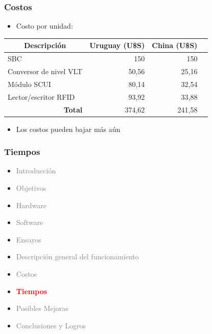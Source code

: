 \documentclass{beamer}
\begin{document}
\begin{frame}
	\frametitle{Costos}
	\begin{itemize}
		\item[] Costo por unidad:
	\end{itemize}
	
	\begin{table}[htbp]
	\begin{tabular}{|l|r|r|r|}
		\hline
		\multicolumn{1}{|c|}{\textbf{Descripción }} & \multicolumn{1}{c|}{\textbf{Uruguay (U\$S)}} & \multicolumn{1}{c|}{\textbf{China (U\$S)}} \\ \hline
		SBC & 150 & 150 \\ \hline
		Conversor de nivel VLT & 50,56 & 25,16 \\ \hline
		Módulo SCUI & 80,14 & 32,54 \\ \hline
		Lector/escritor RFID & 93,92 & 33,88 \\ \hline
		\multicolumn{1}{|r|}{\textbf{Total}} & 374,62 & 241,58 \\ \hline
	\end{tabular}
	\end{table}
	
	\begin{itemize}
		\item[] Los costos pueden bajar más aún
	\end{itemize}
\end{frame}	

\begin{frame}
	\frametitle{Tiempos}
	\begin{itemize}
		\item \textcolor{gray}{Introducción}
		\item \textcolor{gray}{Objetivos}
		\item \textcolor{gray}{Hardware}
		\item \textcolor{gray}{Software}
		\item \textcolor{gray}{Ensayos}
		\item \textcolor{gray}{Descripción general del funcionamiento}		
		\item \textcolor{gray}{Costos}
		\item \textcolor{red}{\bf{Tiempos}}
		\item \textcolor{gray}{Posibles Mejoras}
		\item \textcolor{gray}{Conclusiones y Logros}
	\end{itemize}
\end{frame}
\end{document}

